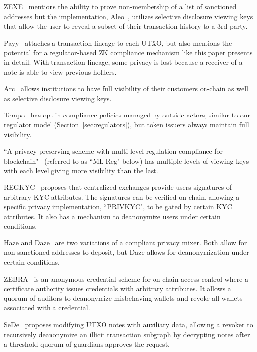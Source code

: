 \documentclass[9pt]{extreport}
\begin{document}
ZEXE~\cite{ZEXE} mentions the ability to prove non-membership of a list of sanctioned addresses but the implementation, Aleo~\cite{aleo2025homepage}, utilizes selective disclosure viewing keys that allow the user to reveal a subset of their transaction history to a 3rd party.  

Payy~\cite{payywhitepaper} attaches a transaction lineage to each UTXO, but also mentions the potential for a regulator-based ZK compliance mechanism like this paper presents in detail.  With transaction lineage, some privacy is lost because a receiver of a note is able to view previous holders.  

Arc~\cite{circlearc} allows institutions to have full visibility of their customers on-chain as well as selective disclosure viewing keys.  

Tempo~\cite{tempo2025} has opt-in compliance policies managed by outside actors, similar to our regulator model (Section~\ref{sec:regulators}), but token issuers always maintain full visibility.  

``A privacy-preserving scheme with multi-level regulation compliance for blockchain"~\cite{privacyregulation} (referred to as ``ML Reg" below) has multiple levels of viewing keys with each level giving more visibility than the last.  

REGKYC~\cite{Xiong2025REGKYCSP} proposes that centralized exchanges provide users signatures of arbitrary KYC attributes.  The signatures can be verified on-chain, allowing a specific privacy implementation, ``PRIVKYC", to be gated by certain KYC attributes.  It also has a mechanism to deanonymize users under certain conditions.  

Haze and Daze~\cite{hazedaze} are two variations of a compliant privacy mixer.  Both allow for non-sanctioned addresses to deposit, but Daze allows for deanonymization under certain conditions.  

ZEBRA~\cite{Rathee2022ZEBRAAC} is an anonymous credential scheme for on-chain access control where a certificate authority issues credentials with arbitrary attributes.  It allows a quorum of auditors to deanonymize misbehaving wallets and revoke all wallets associated with a credential.  

SeDe~\cite{chaudhary2025sedebalancingblockchainprivacy} proposes modifying UTXO notes with auxiliary data, allowing a revoker to recursively deanonymize an illicit transaction subgraph by decrypting notes after a threshold quorum of guardians approves the request.  
\end{document}
